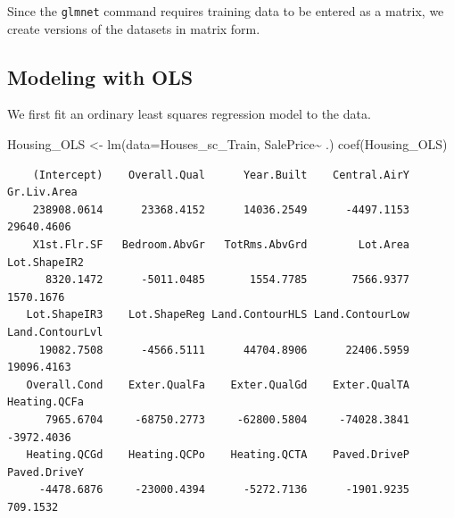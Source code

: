\documentclass[
  letterpaper,
  DIV=11,
  numbers=noendperiod]{scrreprt}
\newenvironment{Shaded}{\begin{snugshade}}{\end{snugshade}}
\newcommand{\AttributeTok}[1]{\textcolor[rgb]{0.40,0.45,0.13}{#1}}
\newcommand{\CommentTok}[1]{\textcolor[rgb]{0.37,0.37,0.37}{#1}}
\newcommand{\DecValTok}[1]{\textcolor[rgb]{0.68,0.00,0.00}{#1}}
\newcommand{\FunctionTok}[1]{\textcolor[rgb]{0.28,0.35,0.67}{#1}}
\newcommand{\NormalTok}[1]{\textcolor[rgb]{0.00,0.23,0.31}{#1}}
\newcommand{\OtherTok}[1]{\textcolor[rgb]{0.00,0.23,0.31}{#1}}
\newcommand{\SpecialCharTok}[1]{\textcolor[rgb]{0.37,0.37,0.37}{#1}}
\begin{document}
Since the \texttt{glmnet} command requires training data to be entered
as a matrix, we create versions of the datasets in matrix form.

\begin{Shaded}
\end{Shaded}

\subsection{Modeling with OLS}\label{modeling-with-ols}

We first fit an ordinary least squares regression model to the data.

\begin{Shaded}
\begin{Highlighting}[]
\NormalTok{Housing\_OLS }\OtherTok{\textless{}{-}} \FunctionTok{lm}\NormalTok{(}\AttributeTok{data=}\NormalTok{Houses\_sc\_Train, SalePrice}\SpecialCharTok{\textasciitilde{}}\NormalTok{ .)}
\FunctionTok{coef}\NormalTok{(Housing\_OLS)}
\end{Highlighting}
\end{Shaded}

\begin{verbatim}
    (Intercept)    Overall.Qual      Year.Built    Central.AirY     Gr.Liv.Area 
    238908.0614      23368.4152      14036.2549      -4497.1153      29640.4606 
    X1st.Flr.SF   Bedroom.AbvGr   TotRms.AbvGrd        Lot.Area    Lot.ShapeIR2 
      8320.1472      -5011.0485       1554.7785       7566.9377       1570.1676 
   Lot.ShapeIR3    Lot.ShapeReg Land.ContourHLS Land.ContourLow Land.ContourLvl 
     19082.7508      -4566.5111      44704.8906      22406.5959      19096.4163 
   Overall.Cond    Exter.QualFa    Exter.QualGd    Exter.QualTA    Heating.QCFa 
      7965.6704     -68750.2773     -62800.5804     -74028.3841      -3972.4036 
   Heating.QCGd    Heating.QCPo    Heating.QCTA    Paved.DriveP    Paved.DriveY 
     -4478.6876     -23000.4394      -5272.7136      -1901.9235        709.1532 
\end{verbatim}
\end{document}
